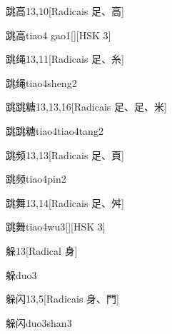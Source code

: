 \begin{entry}{跳高}{13,10}[Radicais ⾜、⾼]
  \begin{phonetics}{跳高}{tiao4 gao1}[][HSK 3]
  \end{phonetics}
\end{entry}

\begin{entry}{跳绳}{13,11}[Radicais ⾜、⽷]
  \begin{phonetics}{跳绳}{tiao4sheng2}
  \end{phonetics}
\end{entry}

\begin{entry}{跳跳糖}{13,13,16}[Radicais ⾜、⾜、⽶]
  \begin{phonetics}{跳跳糖}{tiao4tiao4tang2}
  \end{phonetics}
\end{entry}

\begin{entry}{跳频}{13,13}[Radicais ⾜、⾴]
  \begin{phonetics}{跳频}{tiao4pin2}
  \end{phonetics}
\end{entry}

\begin{entry}{跳舞}{13,14}[Radicais ⾜、⾇]
  \begin{phonetics}{跳舞}{tiao4wu3}[][HSK 3]
  \end{phonetics}
\end{entry}

\begin{entry}{躲}{13}[Radical ⾝]
  \begin{phonetics}{躲}{duo3}
  \end{phonetics}
\end{entry}

\begin{entry}{躲闪}{13,5}[Radicais ⾝、⾨]
  \begin{phonetics}{躲闪}{duo3shan3}
  \end{phonetics}
\end{entry}

